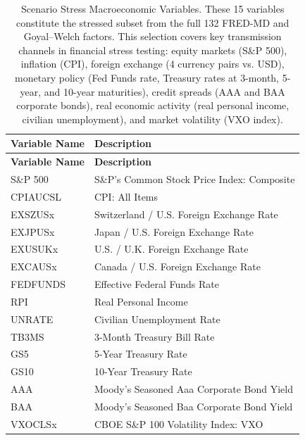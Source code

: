 \documentclass[11pt]{article}
\theoremstyle{plain}
\theoremstyle{definition}
\theoremstyle{remark}
\numberwithin{equation}{section}
\begin{document}
\begin{longtable}{|l|p{8cm}|}
\caption{Scenario Stress Macroeconomic Variables. {These 15 variables constitute the stressed subset from the full 132 
FRED-MD and Goyal--Welch factors. This selection 
covers key transmission channels in financial stress testing: equity markets (S\&P 500), 
inflation (CPI), foreign exchange (4 currency pairs vs. USD), monetary policy (Fed 
Funds rate, Treasury rates at 3-month, 5-year, and 10-year maturities), credit spreads 
(AAA and BAA corporate bonds), real economic activity (real personal income, civilian 
unemployment), and market volatility (VXO index).}} 
\label{tab:scenario_variables}
\\
\hline
\textbf{Variable Name} & \textbf{Description} \\ \hline
\endfirsthead

\hline
\textbf{Variable Name} & \textbf{Description} \\ \hline
\endhead

\hline
\endfoot

\hline
\endlastfoot

S\&P 500 & S\&P's Common Stock Price Index: Composite \\ \hline
CPIAUCSL & CPI: All Items \\ \hline
EXSZUSx & Switzerland / U.S. Foreign Exchange Rate \\ \hline
EXJPUSx & Japan / U.S. Foreign Exchange Rate \\ \hline
EXUSUKx & U.S. / U.K. Foreign Exchange Rate \\ \hline
EXCAUSx & Canada / U.S. Foreign Exchange Rate \\ \hline
FEDFUNDS & Effective Federal Funds Rate \\ \hline
RPI & Real Personal Income \\ \hline
UNRATE & Civilian Unemployment Rate \\ \hline
TB3MS & 3-Month Treasury Bill Rate \\ \hline
GS5 & 5-Year Treasury Rate \\ \hline
GS10 & 10-Year Treasury Rate \\ \hline
AAA & Moody’s Seasoned Aaa Corporate Bond Yield \\ \hline
BAA & Moody’s Seasoned Baa Corporate Bond Yield \\ \hline
VXOCLSx & CBOE S\&P 100 Volatility Index: VXO \\ 

\end{longtable}
\end{document}
